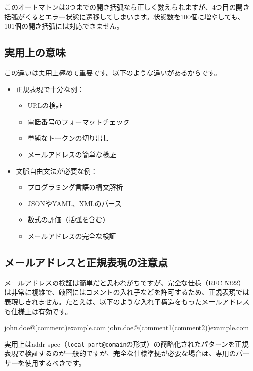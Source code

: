 このオートマトンは3つまでの開き括弧なら正しく数えられますが、4つ目の開き括弧がくるとエラー状態に遷移してしまいます。状態数を100個に増やしても、101個の開き括弧には対応できません。

\subsection{実用上の意味}

この違いは実用上極めて重要です。以下のような違いがあるからです。

\begin{itemize}
\item
  正規表現で十分な例：

  \begin{itemize}
  \item
    URLの検証
  \item
    電話番号のフォーマットチェック
  \item
    単純なトークンの切り出し
  \item
    メールアドレスの簡単な検証
  \end{itemize}
\item
  文脈自由文法が必要な例：

  \begin{itemize}
  \item
    プログラミング言語の構文解析
  \item
    JSONやYAML、XMLのパース
  \item
    数式の評価（括弧を含む）
  \item
    メールアドレスの完全な検証
  \end{itemize}
\end{itemize}

\subsection{メールアドレスと正規表現の注意点}

メールアドレスの検証は簡単だと思われがちですが、完全な仕様（RFC
5322）は非常に複雑で、厳密にはコメントの入れ子などを許可するため、正規表現では表現しきれません。たとえば、以下のような入れ子構造をもったメールアドレスも仕様上は有効です。

\begin{codescreen}{}
john.doe@(comment)example.com
john.doe@(comment1(comment2))example.com
\end{codescreen}

実用上はaddr-spec（\texttt{local-part@domain}の形式）の簡略化されたパターンを正規表現で検証するのが一般的ですが、完全な仕様準拠が必要な場合は、専用のパーサーを使用するべきです。

